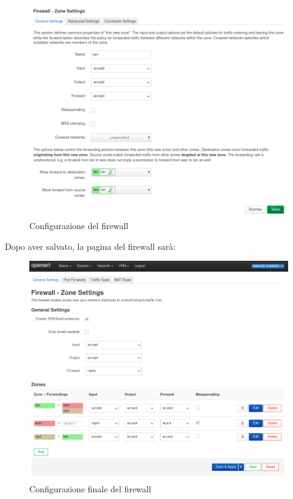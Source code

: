 \begin{figure}[H]
    \centering
    \includegraphics[width=0.9\linewidth]{immagini/LuCI_firewall_vpn1}
    \caption{Configurazione del firewall}
    \label{fig:luci-firewall-vpn}
\end{figure}

Dopo aver salvato, la pagina del firewall sarà:

\begin{figure}[H]
    \centering
    \includegraphics[width=0.9\linewidth]{immagini/LuCI_firewall_end1}
    \caption{Configurazione finale del firewall}
    \label{fig:luci-firewall-end}
\end{figure}

